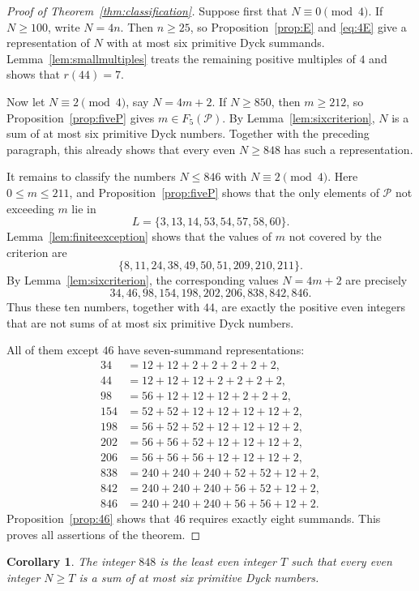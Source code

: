 \documentclass[12pt]{article}
\theoremstyle{plain}
\newtheorem{corollary}[theorem]{Corollary}
\theoremstyle{definition}
\theoremstyle{plain}
\newcommand{\Pset}{\mathcal{P}}
\begin{document}
\begin{proof}[Proof of Theorem~\ref{thm:classification}]
Suppose first that $N\equiv0\pmod 4$.  If $N\geq100$, write $N=4n$.
Then $n\geq25$, so Proposition~\ref{prop:E} and \eqref{eq:4E} give a
representation of $N$ with at most six primitive Dyck summands.
Lemma~\ref{lem:smallmultiples} treats the remaining positive multiples
of $4$ and shows that $r(44)=7$.

Now let $N\equiv2\pmod 4$, say $N=4m+2$.  If $N\geq850$, then $m\geq212$,
so Proposition~\ref{prop:fiveP} gives $m\in F_5(\Pset)$.  By
Lemma~\ref{lem:sixcriterion}, $N$ is a sum of at most six primitive
Dyck numbers.  Together with the preceding paragraph, this already
shows that every even $N\geq848$ has such a representation.

It remains to classify the numbers $N\leq846$ with $N\equiv2\pmod 4$.
Here $0\leq m\leq211$, and Proposition~\ref{prop:fiveP} shows that the
only elements of $\Pset$ not exceeding $m$ lie in
\[
 L=\{3,13,14,53,54,57,58,60\}.
\]
Lemma~\ref{lem:finiteexception} shows that the values of $m$ not
covered by the criterion are
\[
 \{8,11,24,38,49,50,51,209,210,211\}.
\]
By Lemma~\ref{lem:sixcriterion}, the corresponding values $N=4m+2$
are precisely
\[
 34,46,98,154,198,202,206,838,842,846.
\]
Thus these ten numbers, together with $44$, are exactly the positive
even integers that are not sums of at most six primitive Dyck numbers.

All of them except $46$ have seven-summand representations:
\[
\begin{aligned}
34&=12+12+2+2+2+2+2,\\
44&=12+12+12+2+2+2+2,\\
98&=56+12+12+12+2+2+2,\\
154&=52+52+12+12+12+12+2,\\
198&=56+52+52+12+12+12+2,\\
202&=56+56+52+12+12+12+2,\\
206&=56+56+56+12+12+12+2,\\
838&=240+240+240+52+52+12+2,\\
842&=240+240+240+56+52+12+2,\\
846&=240+240+240+56+56+12+2.
\end{aligned}
\]
Proposition~\ref{prop:46} shows that $46$ requires exactly eight
summands.  This proves all assertions of the theorem.
\end{proof}

\begin{corollary}\label{cor:threshold}
The integer $848$ is the least even integer $T$ such that every even
integer $N\geq T$ is a sum of at most six primitive Dyck numbers.
\end{corollary}
\end{document}
